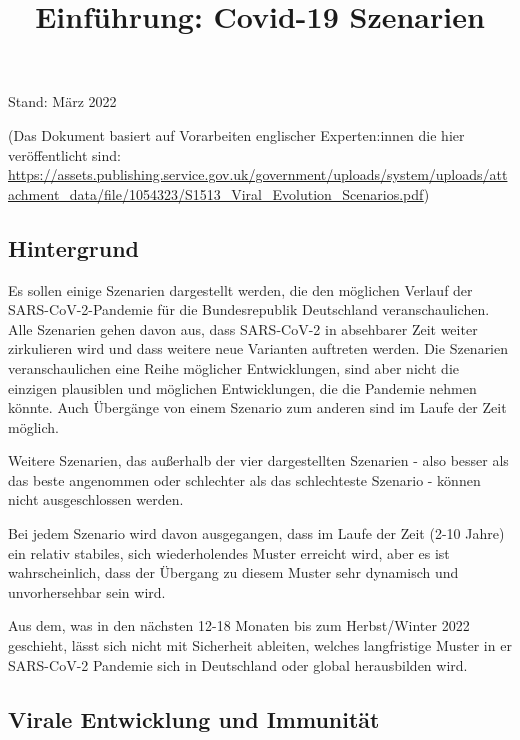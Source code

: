 \documentclass{article}
\begin{document}
\title{Einführung: Covid-19 Szenarien}

\maketitle





Stand:  März 2022 


(Das Dokument basiert auf Vorarbeiten englischer Experten:innen die hier veröffentlicht sind: \href{https://assets.publishing.service.gov.uk/government/uploads/system/uploads/attachment_data/file/1054323/S1513_Viral_Evolution_Scenarios.pdf}{https://assets.publishing.service.gov.uk/government/uploads/system/uploads/attachment\_data/file/1054323/S1513\_Viral\_Evolution\_Scenarios.pdf}) 


\subsection{Hintergrund}\label{H1657566}



Es sollen einige Szenarien dargestellt werden, die den möglichen Verlauf der SARS-CoV-2-Pandemie für die Bundesrepublik Deutschland veranschaulichen. Alle Szenarien gehen davon aus, dass SARS-CoV-2 in absehbarer Zeit weiter zirkulieren wird und dass weitere neue Varianten auftreten werden. Die Szenarien veranschaulichen eine Reihe möglicher Entwicklungen, sind aber nicht die einzigen plausiblen und möglichen Entwicklungen, die die Pandemie nehmen könnte. Auch Übergänge von einem Szenario zum anderen sind im Laufe der Zeit möglich. 


Weitere Szenarien, das außerhalb der vier dargestellten Szenarien - also besser als das beste angenommen oder schlechter als das schlechteste Szenario - können nicht ausgeschlossen werden.


Bei jedem Szenario wird davon ausgegangen, dass im Laufe der Zeit (2-10 Jahre) ein relativ stabiles, sich wiederholendes Muster erreicht wird, aber es ist wahrscheinlich, dass der Übergang zu diesem Muster sehr dynamisch und unvorhersehbar sein wird. 


Aus dem, was in den nächsten 12-18 Monaten bis zum Herbst/Winter 2022 geschieht, lässt sich nicht mit Sicherheit ableiten, welches langfristige Muster in er SARS-CoV-2 Pandemie sich in Deutschland oder global herausbilden wird.


\subsection{Virale Entwicklung und Immunität}\label{H7213471}
\end{document}
